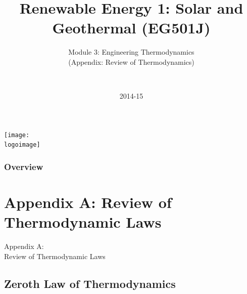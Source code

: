 \documentclass[10pt,compress,handout,ignorenonframetext]{beamer}
\institute{School of Engineering}
\title{Renewable Energy 1: Solar and Geothermal (EG501J)}
\subtitle{Module 3: Engineering Thermodynamics \\ (Appendix: Review of Thermodynamics)}
\date[2014-15]{2014-15}
\author[\shortname]{%
  \fullname\\\ttfamily{\emailaddress}
}
\newcommand{\logoimage}{../FigBanner/UoAHorizBanner}
\begin{document}
\begin{frame}
  \titlepage
  \vfill%
  \begin{center}
    \texttt{[image: \\logoimage]}
  \end{center}
\end{frame}


\begin{frame}
\frametitle{Overview} %
\tableofcontents %
\end{frame}







\section{Appendix A: Review of Thermodynamic Laws}\label{AppendixA}

\begin{frame}
   \begin{center}
      \huge{Appendix A:}\\
      \huge{Review of Thermodynamic Laws}
   \end{center}
\end{frame}


\subsection{Zeroth Law of Thermodynamics}
\end{document}

